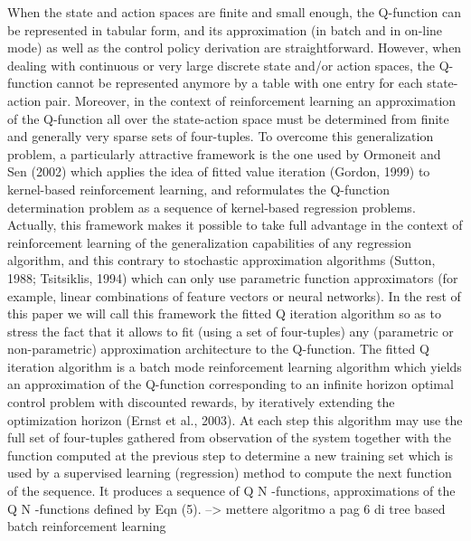 	When the state and action spaces are finite and small enough, the Q-function can be represented in tabular form, and its approximation (in batch and in on-line mode) as well as the control policy derivation are straightforward. However, when dealing with continuous or very large discrete state and/or action spaces, the Q-function cannot be represented anymore by a table with one entry for each state-action pair. Moreover, in the context of reinforcement learning an approximation of the Q-function all over the state-action space must be determined from finite and generally very sparse sets of four-tuples.
To overcome this generalization problem, a particularly attractive framework is the one used by Ormoneit and Sen (2002) which applies the idea of fitted value iteration (Gordon, 1999) to kernel-based reinforcement learning, and reformulates the Q-function determination problem as a sequence of kernel-based regression problems. Actually, this framework makes it possible to take full advantage in the context of reinforcement learning of the generalization capabilities of any regression algorithm, and this contrary to stochastic approximation algorithms (Sutton, 1988; Tsitsiklis, 1994) which can only use parametric function approximators (for example, linear combinations of feature vectors or neural networks). In the rest of this paper we will call this framework the fitted Q iteration
algorithm so as to stress the fact that it allows to fit (using a set of four-tuples) any (parametric or non-parametric) approximation architecture to the Q-function.
The fitted Q iteration algorithm is a batch mode reinforcement learning algorithm which yields an approximation of the Q-function corresponding to an infinite horizon optimal control problem with discounted rewards, by iteratively extending the optimization horizon (Ernst et al., 2003).
At each step this algorithm may use the full set of four-tuples gathered from observation of the system together with the function computed at the previous step to determine a new training set which is used by a supervised learning (regression) method to compute the next function of the sequence. It produces a sequence of Q N -functions, approximations of the Q N -functions defined by Eqn (5). --> mettere algoritmo a pag 6 di tree based batch reinforcement learning

